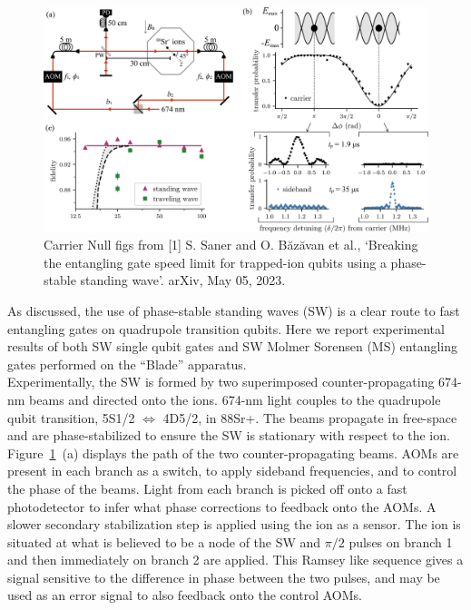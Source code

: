 \documentclass[12pt]{iopart}
\begin{document}
\begin{figure}
  \begin{center}
   \noindent\includegraphics[width=\linewidth]{figures/cnulled_figs.png}
  \end{center}
  \caption{Carrier Null figs from [1] S. Saner and O. Băzăvan et al., `Breaking the
    entangling gate speed limit for trapped-ion qubits using a
    phase-stable standing wave'. arXiv, May 05, 2023.}

  \label{fig:cnull}
\end{figure}

    As discussed, the use of phase-stable standing waves (SW) is a
    clear route to fast entangling gates on quadrupole transition
    qubits.  Here we report experimental results of both SW single
    qubit gates and SW Molmer Sorensen (MS) entangling gates performed
    on the ``Blade'' apparatus.\\

    Experimentally, the SW is formed by two superimposed
    counter-propagating 674-nm beams and directed onto the
    ions. 674-nm light couples to the quadrupole qubit transition,
    5S1/2 $\Leftrightarrow$ 4D5/2, in 88Sr+. The beams propagate in free-space and are
    phase-stabilized to ensure the SW is stationary with respect to
    the ion. Figure~\ref{fig:cnull}~(a) displays the path of the two counter-propagating
    beams. AOMs are present in each branch as a switch, to apply
    sideband frequencies, and to control the phase of the beams. Light
    from each branch is picked off onto a fast photodetector to infer
    what phase corrections to feedback onto the AOMs. A slower
    secondary stabilization step is applied using the ion as a
    sensor. The ion is situated at what is believed to be a node of
    the SW and $\pi/2$ pulses on branch 1 and then immediately on
    branch 2 are applied.  This Ramsey like sequence gives a signal
    sensitive to the difference in phase between the two pulses, and
    may be used as an error signal to also feedback onto the control
    AOMs.\\
\end{document}
